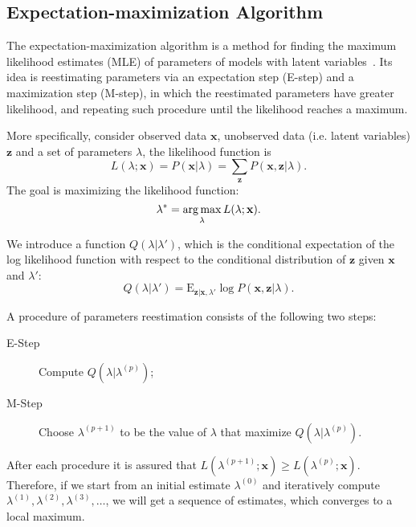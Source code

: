 \documentclass[12pt,final,twoside]{report}
\begin{document}
\subsection{Expectation-maximization Algorithm}
The expectation-maximization algorithm is a method for finding the maximum likelihood estimates (MLE) of parameters of models with latent variables~\cite{dempster_maximum_1977}. Its idea is reestimating parameters via an expectation step (E-step) and a maximization step (M-step), in which the reestimated parameters have greater likelihood, and repeating such procedure until the likelihood reaches a maximum.

More specifically, consider observed data $\mathbf{x}$, unobserved data (i.e. latent variables) $\mathbf{z}$ and a set of parameters $\lambda$, the likelihood function is
\begin{equation}
  L(\lambda;\mathbf{x}) = P(\mathbf{x}|\lambda) = \sum_{\mathbf{z}} P(\mathbf{x},\mathbf{z}|\lambda) .
\end{equation}
The goal is maximizing the likelihood function:
\begin{equation}
  \lambda^* = \operatorname*{arg\,max}_\lambda L(\lambda;\mathbf{x}).
\end{equation}

We introduce a function $Q(\lambda|\lambda')$, which is the conditional expectation of the log likelihood function with respect to the conditional distribution of $\mathbf{z}$ given $\mathbf{x}$ and $\lambda'$:
\begin{equation}
  Q(\lambda|\lambda') = \text{E}_{\mathbf{z}|\mathbf{x},\lambda'} \log P(\mathbf{x},\mathbf{z}|\lambda) .
\end{equation}

A procedure of parameters reestimation consists of the following two steps:
\begin{description}
  \item[E-Step] Compute $Q(\lambda|\lambda^{(p)})$;
  \item[M-Step] Choose $\lambda^{(p+1)}$ to be the value of $\lambda$ that maximize $Q(\lambda|\lambda^{(p)})$.
\end{description}

After each procedure it is assured that $L(\lambda^{(p+1)};\mathbf{x}) \geq L(\lambda^{(p)};\mathbf{x})$. Therefore, if we start from an initial estimate $\lambda^{(0)}$ and iteratively compute $\lambda^{(1)},\lambda^{(2)},\lambda^{(3)},\dots$, we will get a sequence of estimates, which converges to a local maximum.
\end{document}
